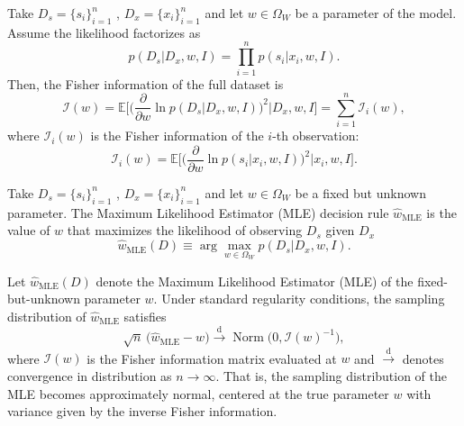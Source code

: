 \begin{theorem}
	\label{thm:fisher_sample}
	Take $D_s= \{s_i\}_{i=1}^n$ , $D_x = \{x_i\}_{i=1}^n$ and let $w \in \Omega_W$ be a parameter of the model. Assume the likelihood factorizes as
	\begin{equation}
		p(D_s | D_x, w, I) = \prod_{i=1}^{n} p(s_i | x_i, w, I).
	\end{equation}
	Then, the Fisher information of the full dataset is
	\begin{equation}
		\mathcal{I}(w) 
		= \mathbb{E}\Bigg[\Big(\frac{\partial}{\partial w} \ln p(D_s | D_x, w, I)\Big)^2 \Bigg| D_x, w, I \Bigg] 
		= \sum_{i=1}^{n} \mathcal{I}_i(w),
	\end{equation}
	where $\mathcal{I}_i(w)$ is the Fisher information of the $i$-th observation:
	\begin{equation}
		\mathcal{I}_i(w) = \mathbb{E}\Bigg[\Bigg(\frac{\partial}{\partial w} \ln p(s_i | x_i, w, I)\Bigg)^2 \Bigg| x_i, w, I \Bigg].
	\end{equation}
\end{theorem}

\begin{definition}
	\label{def:MLE}
	Take $D_s= \{s_i\}_{i=1}^n$ , $D_x = \{x_i\}_{i=1}^n$ and let $w \in \Omega_W$ be a fixed but unknown parameter. The Maximum Likelihood Estimator (MLE) decision rule  $\hat{w}_{\mathrm{MLE}}$ is the value of $w$ that maximizes the likelihood of observing $D_s$ given $D_x$
	\begin{equation}
		\hat{w}_{\mathrm{MLE}}(D) \equiv \arg \max_{w \in \Omega_W} p(D_s | D_x, w, I).
	\end{equation}
\end{definition}

\begin{theorem}
	\label{thm:unbiased_mle}
	Let $\hat{w}_{\mathrm{MLE}}(D)$ denote the Maximum Likelihood Estimator (MLE) of the fixed-but-unknown parameter $w$. Under standard regularity conditions, the sampling distribution of $\hat{w}_{\mathrm{MLE}}$ satisfies
	\begin{equation}
		\sqrt{n}\,\big(\hat{w}_{\mathrm{MLE}} - w\big) \xrightarrow{\text{d}} \operatorname{Norm}\big(0, \mathcal{I}(w)^{-1}\big),
	\end{equation}
	where $\mathcal{I}(w)$ is the Fisher information matrix evaluated at $w$ and $\xrightarrow{\text{d}}$ denotes convergence in distribution as $n \to \infty$. 
	That is, the sampling distribution of the MLE becomes approximately normal, centered at the true parameter $w$ with variance given by the inverse Fisher information.
\end{theorem}


